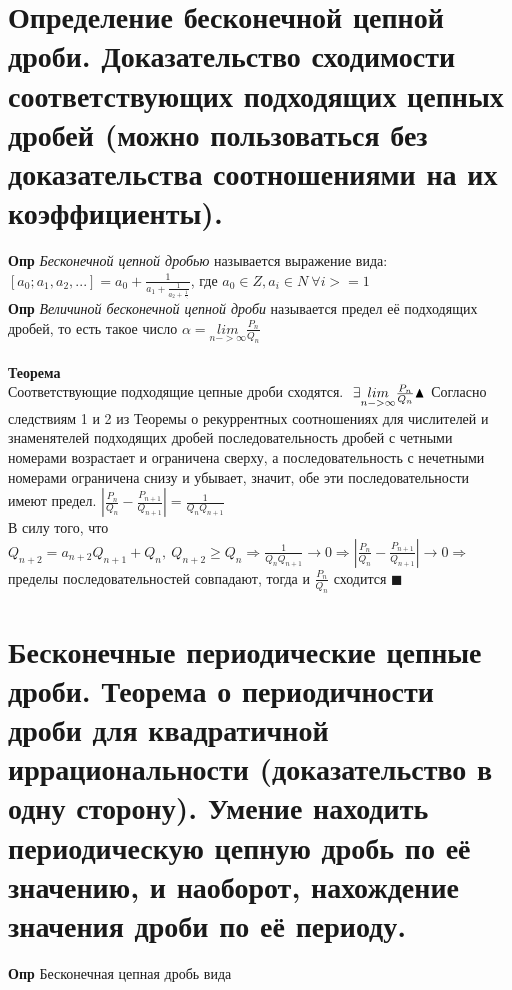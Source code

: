 \section{Определение бесконечной цепной дроби. Доказательство сходимости соответствующих подходящих
цепных дробей (можно пользоваться без доказательства соотношениями на их коэффициенты).}
\textbf{Опр} \textit{Бесконечной цепной дробью} называется выражение вида:\\  $[a_0; a_1, a_2, ...] = a_0 +\frac{1}{ a_1 + \frac{1}{a_2 + \frac{1}{\ddots}}}$, где $a_0 \in Z, a_i \in N \ \forall i >=1$
\\
\textbf{Опр} \textit{Величиной бесконечной цепной дроби} называется предел её подходящих дробей, то есть такое число $\alpha = \underset{n->\infty}{lim}\frac{P_n}{Q_n}$\\ \\
\textbf{Теорема}
\\
Соответствующие подходящие цепные дроби сходятся. $\ \exists \underset{n->\infty}{lim}\frac{P_n}{Q_n} \\ \blacktriangle$ 
Согласно следствиям 1 и 2 из Теоремы о рекуррентных соотношениях для числителей и знаменятелей подходящих дробей последовательность дробей с четными номерами возрастает и ограничена сверху, а последовательность с нечетными номерами ограничена снизу и убывает, значит, обе эти последовательности имеют предел. $|\frac{P_n}{Q_n} - \frac{P_{n+1}}{Q_{n+1}}| = \frac{1}{Q_n Q_{n+1}}$
\\ В силу того, что $Q_{n+2} = a_{n+2}Q_{n+1} + Q_n, \  Q_{n+2} \geq Q_n \Longrightarrow \frac{1}{Q_n Q_{n+1}} \longrightarrow 0 \Longrightarrow |\frac{P_n}{Q_n} - \frac{P_{n+1}}{Q_{n+1}}|  \longrightarrow 0 \Longrightarrow$ пределы последовательностей совпадают, тогда и $\frac{P_n}{Q_n}$ сходится $\blacksquare$


\section{Бесконечные периодические цепные дроби. Теорема о периодичности дроби для квадратичной иррациональности (доказательство в одну сторону). Умение находить периодическую цепную дробь по её значению, и наоборот, нахождение значения дроби по её периоду.}
\textbf{Опр} Бесконечная цепная дробь вида


